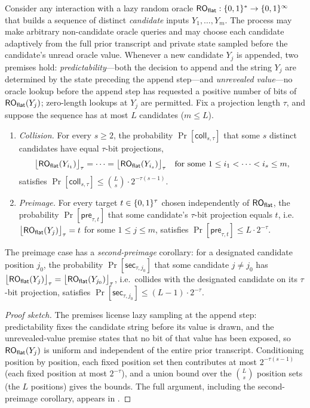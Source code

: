 \begin{lemma}
\label{lem:adaptive-candidate}
Consider any interaction with a lazy random oracle $\mathsf{RO}_{\mathsf{flat}} : \{0,1\}^* \to
\{0,1\}^\infty$ that builds a sequence of distinct \emph{candidate} inputs
$Y_1,\dots,Y_m$. The process may make arbitrary non-candidate oracle
queries and may choose each candidate adaptively from the full prior
transcript and private state sampled before the candidate's unread oracle
value. Whenever a new candidate $Y_j$ is appended, two premises hold:
\emph{predictability}---both the decision to append and the string $Y_j$
are determined by the state preceding the append step---and
\emph{unrevealed value}---no oracle lookup before the append step has
requested a positive number of bits of $\mathsf{RO}_{\mathsf{flat}}(Y_j)$; zero-length lookups
at $Y_j$ are permitted. Fix a projection length $\tau$, and suppose the
sequence has at most $L$ candidates ($m \leq L$).
\begin{enumerate}
\item \emph{Collision.} For every $s \geq 2$, the
  probability $\Pr[\mathsf{coll}_{s,\tau}]$ that some $s$ distinct
  candidates have equal $\tau$-bit projections,
  \[
    \bigl\lfloor \mathsf{RO}_{\mathsf{flat}}(Y_{i_1}) \bigr\rfloor_\tau = \cdots =
    \bigl\lfloor \mathsf{RO}_{\mathsf{flat}}(Y_{i_s}) \bigr\rfloor_\tau
    \quad \text{for some } 1 \leq i_1 < \cdots < i_s \leq m,
  \]
  satisfies
  $\Pr[\mathsf{coll}_{s,\tau}] \leq \binom{L}{s} \cdot 2^{-\tau(s-1)}$.
\item \emph{Preimage.} For every target $t \in \{0,1\}^\tau$ chosen
  independently of $\mathsf{RO}_{\mathsf{flat}}$, the probability
  $\Pr[\mathsf{pre}_{\tau,t}]$ that some candidate's $\tau$-bit projection
  equals $t$, i.e.\ $\bigl\lfloor \mathsf{RO}_{\mathsf{flat}}(Y_j) \bigr\rfloor_\tau = t$ for
  some $1 \leq j \leq m$, satisfies
  $\Pr[\mathsf{pre}_{\tau,t}] \leq L \cdot 2^{-\tau}$.
\end{enumerate}
The preimage case has a \emph{second-preimage} corollary: for a
designated candidate position $j_0$, the probability
$\Pr[\mathsf{sec}_{\tau,j_0}]$ that some candidate $j \neq j_0$ has
$\bigl\lfloor \mathsf{RO}_{\mathsf{flat}}(Y_j) \bigr\rfloor_\tau =
 \bigl\lfloor \mathsf{RO}_{\mathsf{flat}}(Y_{j_0}) \bigr\rfloor_\tau$, i.e.\ collides with the
designated candidate on its $\tau$-bit projection, satisfies
$\Pr[\mathsf{sec}_{\tau,j_0}] \leq (L-1) \cdot 2^{-\tau}$.
\end{lemma}

\begin{proof}[Proof sketch]
The premises license lazy sampling at the append step: predictability
fixes the candidate string before its value is drawn, and the
unrevealed-value premise states that no bit of that value has been
exposed, so $\mathsf{RO}_{\mathsf{flat}}(Y_j)$ is uniform and independent of the entire prior
transcript. Conditioning position by position, each fixed position set
then contributes at most $2^{-\tau(s-1)}$ (each fixed position at most
$2^{-\tau}$), and a union bound over the $\binom{L}{s}$ position sets
(the $L$ positions) gives the bounds. The full argument, including the
second-preimage corollary, appears in
.
\end{proof}

